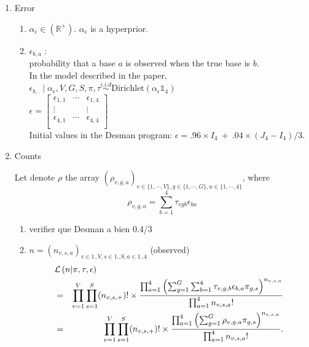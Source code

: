 \documentclass{article}
\begin{document}
\begin{enumerate}
\begin{enumerate}
   
   \end{enumerate}
    \item Error
    \begin{enumerate}
    \item $\alpha_\epsilon\in\left(\mathbb{R}^+\right)$. $\alpha_\epsilon$ is a hyperprior.
    \item $\epsilon_{b,a}$ :\\ probability that a base $a$ is observed when the true base is $b$.\\
    In the model described in the paper, 
    $\epsilon_{b,.}\mid\alpha_\epsilon,V,G,S,\pi,\tau\overset{i.i.d}{\sim}\mathrm{Dirichlet}(\alpha_\epsilon\mathds{1}_4)$ \\
    $\epsilon=\begin{bmatrix}
\epsilon_{1,1}&\cdots&\epsilon_{1,4}\\
\vdots&&\vdots\\
\epsilon_{4,1}&\cdots&\epsilon_{4,4}\\
    \end{bmatrix}$\\
    Initial values in the Desman program: $\epsilon=.96\times I_4~+~.04 \times (J_4-I_4)/3$.
    \end{enumerate}
    \item Counts

    Let denote $\rho$ the array $\left(\rho_{v,g,a}\right)_{v\in\{1,\cdots,V\},g\in\{1,\cdots,G\},a\in\{1,\cdots,4\}}$, where
$$\rho_{v,g,a}=\sum_{b=1}^4\tau_{vgb}\epsilon_{ba}$$

    \begin{enumerate}

\item {\color{red} verifier que Desman a bien 0.4/3}
    
\item $n=(n_{v,s,a})_{v\in 1..V,s\in 1..S,a\in 1..4}$ (observed)\\
\begin{eqnarray}\lefteqn{\mathcal{L}\left(n | \pi, \tau,\epsilon \right)}\nonumber\\& =& \prod_{v=1}^{V} \prod_{s = 1}^{S} (n_{v,s,+})!\times\frac{\prod_{a = 1}^{4} \left( \sum_{g = 1}^{G}\sum_{b=1}^{4} \tau_{v,g,b}\epsilon_{b,a} \pi_{g,s}  \right)^{n_{v,s,a}}}{\prod_{a = 1}^{4}n_{v,s,a}!}\nonumber\\
& =&\prod_{v=1}^{V} \prod_{s = 1}^{S} (n_{v,s,+})!\times\frac{\prod_{a = 1}^{4} \left( \sum_{g = 1}^{G} \rho_{v,g,a} \pi_{g,s}  \right)^{n_{v,s,a}}}{\prod_{a = 1}^{4}n_{v,s,a}!}.\label{eq:likelihood}\end{eqnarray}


\end{enumerate}
\end{enumerate}
\end{document}
